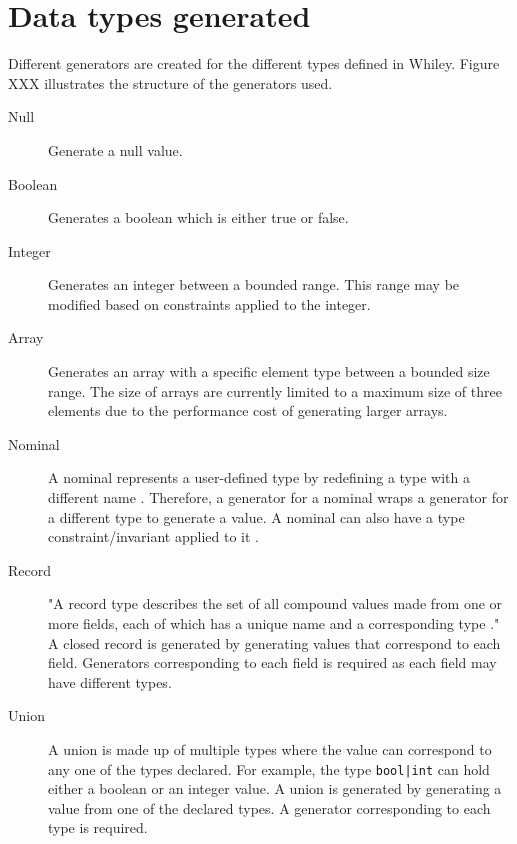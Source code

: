 \section{Data types generated}
Different generators are created for the different types defined in Whiley. 
Figure XXX illustrates the structure of the generators used.



\begin{description}
	\item[Null] Generate a null value.
	\item[Boolean] Generates a boolean which is either true or false.
	\item[Integer] Generates an integer between a bounded range. This range may be modified based on constraints applied to the integer.
	\item[Array] Generates an array with a specific element type between a bounded size range.
	The size of arrays are currently limited to a maximum size of three elements due to the performance cost of generating larger arrays.
	\item[Nominal] A nominal represents a user-defined type by redefining a type with a different name \cite{WhileyLang}. Therefore, a generator for a nominal wraps a generator for a different type to generate a value. A nominal can also have a type constraint/invariant applied to it \cite{WhileyLang}.
	\item[Record] "A record type describes the set of all compound values made from one or more fields, each of which has a unique name and a corresponding type \cite{WhileyLang}." 
	A closed record is generated by generating values that correspond to each field. Generators corresponding to each field is required as each field may have different types. 
	\item[Union] A union is made up of multiple types where the value can correspond to any one of the types declared. For example, the type \texttt{bool|int} can hold either a boolean or an integer value. 
	A union is generated by generating a value from one of the declared types. A generator corresponding to each type is required. 
\end{description}




